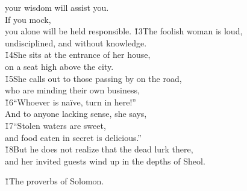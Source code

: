 \begin{poetry}
\poemll    your wisdom will assist you. \\
\poeml If you mock, \\
\poemll    you alone will be held responsible.
\poeml \v{13}The foolish woman is loud, \\
\poemll    undisciplined, and without knowledge. \\
\poeml \v{14}She sits at the entrance of her house, \\
\poemll    on a seat high above the city. \\
\poeml \v{15}She calls out to those passing by on the road, \\
\poemll    who are minding their own business, \\
\poeml \v{16}``Whoever is na\"{i}ve, turn in here!'' \\
\poemll    And to anyone lacking sense, she says, \\
\poeml \v{17}``Stolen waters are sweet, \\
\poemll    and food eaten in secret is delicious.'' \\
\poeml \v{18}But he does not realize that the dead lurk there, \\
\poemll    and her invited guests wind up in the depths of Sheol.
\end{poetry}

\v{1}The proverbs of Solomon.


